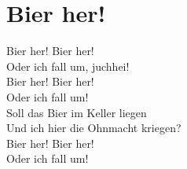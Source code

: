 \section{Bier her!}
Bier her! Bier her! \\
Oder ich fall um, juchhei!\\
Bier her! Bier her!\\
Oder ich fall um!\\
Soll das Bier im Keller liegen\\
Und ich hier die Ohnmacht kriegen?\\
Bier her! Bier her!\\
Oder ich fall um! 

